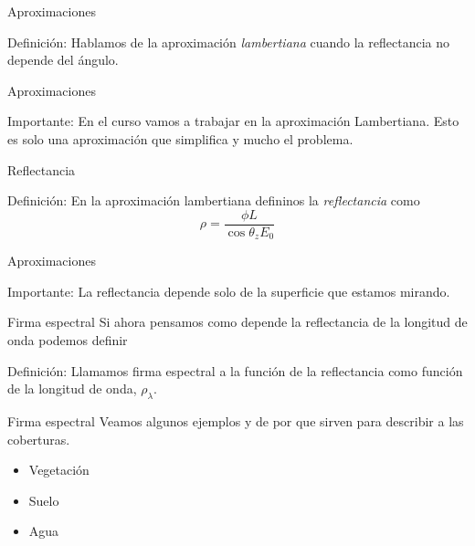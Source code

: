 \documentclass[]{beamer}
\begin{document}
\begin{frame}{Aproximaciones}
  \begin{block}{Definición:}
    Hablamos de la aproximación \emph{lambertiana} cuando la reflectancia no depende del ángulo.
  \end{block}
\end{frame}

\begin{frame}{Aproximaciones}
  \begin{alertblock}{Importante:}
    En el curso vamos a trabajar en la aproximación Lambertiana. Esto es solo una aproximación que simplifica y mucho el problema.
  \end{alertblock}
\end{frame}

\begin{frame}{Reflectancia}
  \begin{block}{Definición:}
    En la aproximación lambertiana defininos la \emph{reflectancia} como
    \begin{equation}
      \rho = \frac{\phi L}{\cos \theta_z E_0}
    \end{equation}
  \end{block}
\end{frame}

\begin{frame}{Aproximaciones}
  \begin{alertblock}{Importante:}
    La reflectancia depende solo de la superficie que estamos mirando.
  \end{alertblock}
\end{frame}

\begin{frame}{Firma espectral}
  Si ahora pensamos como depende la reflectancia de la longitud de onda podemos definir
  \begin{block}{Definición:}
    Llamamos firma espectral a la función de la reflectancia como función de la longitud de onda, $\rho_\lambda$.
  \end{block}
\end{frame}

\begin{frame}{Firma espectral}
  Veamos algunos ejemplos y de por que sirven para describir a las coberturas.
  \begin{itemize}
    \item Vegetación
    \item Suelo
    \item Agua
  \end{itemize}
\end{frame}
\end{document}
